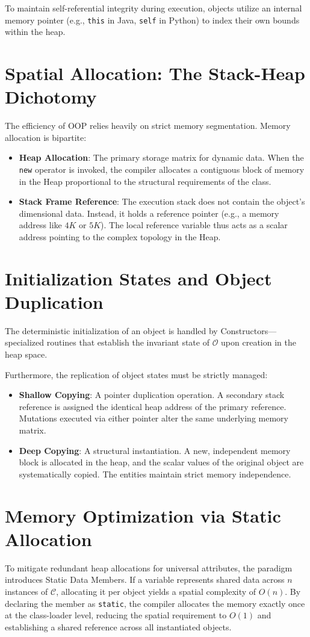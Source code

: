 \documentclass[10pt,journal,compsoc]{IEEEtran}
\begin{document}
To maintain self-referential integrity during execution, objects utilize an internal memory pointer (e.g., \texttt{this} in Java, \texttt{self} in Python) to index their own bounds within the heap.

\section{Spatial Allocation: The Stack-Heap Dichotomy}
The efficiency of OOP relies heavily on strict memory segmentation. Memory allocation is bipartite:
\begin{itemize}
\item \textbf{Heap Allocation}: The primary storage matrix for dynamic data. When the \texttt{new} operator is invoked, the compiler allocates a contiguous block of memory in the Heap proportional to the structural requirements of the class.
\item \textbf{Stack Frame Reference}: The execution stack does not contain the object's dimensional data. Instead, it holds a reference pointer (e.g., a memory address like $4K$ or $5K$). The local reference variable thus acts as a scalar address pointing to the complex topology in the Heap.
\end{itemize}

\section{Initialization States and Object Duplication}
The deterministic initialization of an object is handled by Constructors—specialized routines that establish the invariant state of $\mathcal{O}$ upon creation in the heap space.

Furthermore, the replication of object states must be strictly managed:
\begin{itemize}
\item \textbf{Shallow Copying}: A pointer duplication operation. A secondary stack reference is assigned the identical heap address of the primary reference. Mutations executed via either pointer alter the same underlying memory matrix.
\item \textbf{Deep Copying}: A structural instantiation. A new, independent memory block is allocated in the heap, and the scalar values of the original object are systematically copied. The entities maintain strict memory independence.
\end{itemize}

\section{Memory Optimization via Static Allocation}
To mitigate redundant heap allocations for universal attributes, the paradigm introduces Static Data Members. If a variable represents shared data across $n$ instances of $\mathcal{C}$, allocating it per object yields a spatial complexity of $O(n)$. By declaring the member as \texttt{static}, the compiler allocates the memory exactly once at the class-loader level, reducing the spatial requirement to $O(1)$ and establishing a shared reference across all instantiated objects.
\end{document}
